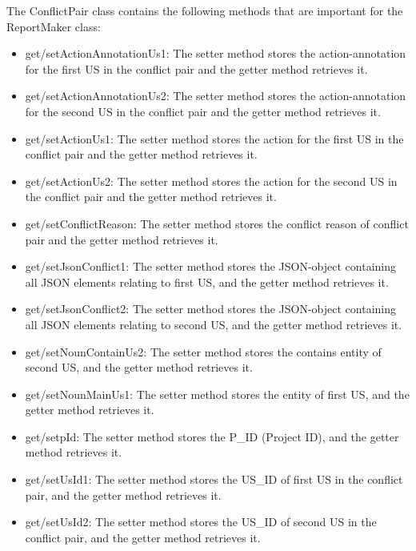 The ConflictPair class contains the following methods that are important for the ReportMaker class:
\begin{itemize}
	\item get/setActionAnnotationUs1: The setter method stores the action-annotation for the first US in the conflict pair and the getter method retrieves it.
	
	\item get/setActionAnnotationUs2: The setter method stores the action-annotation for the second US in the conflict pair and the getter method retrieves it.
	
	\item get/setActionUs1: The setter method stores the action for the first US in the conflict pair and the getter method retrieves it.
	
	\item get/setActionUs2: The setter method stores the action for the second US in the conflict pair and the getter method retrieves it.
		
	\item get/setConflictReason: The setter method stores the conflict reason of conflict pair and the getter method retrieves it.
	
	\item get/setJsonConflict1: The setter method stores the JSON-object containing all JSON elements relating to first US, and the getter method retrieves it.
	
	\item get/setJsonConflict2: The setter method stores the JSON-object containing all JSON elements relating to second US, and the getter method retrieves it.
	
	\item get/setNounContainUs2: The setter method stores the contains entity of second US, and the getter method retrieves it.
	
	\item get/setNounMainUs1: The setter method stores the entity of first US, and the getter method retrieves it.
	
	\item get/setpId: The setter method stores the P\_ID (Project ID), and the getter method retrieves it.
	
	\item get/setUsId1: The setter method stores the US\_ID of first US in the conflict pair, and the getter method retrieves it.
	
	\item get/setUsId2: The setter method stores the US\_ID of second US in the conflict pair, and the getter method retrieves it.
	

\end{itemize}
